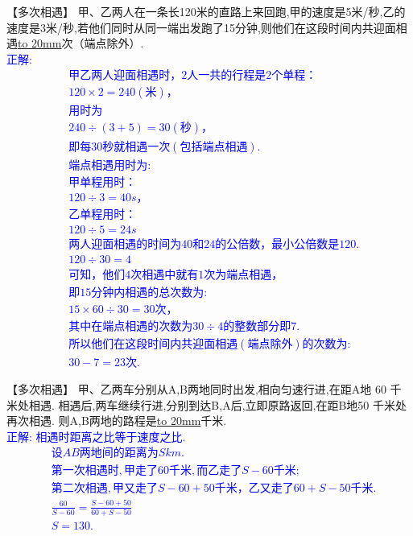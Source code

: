 \item {
    【多次相遇】
    甲、乙两人在一条长120米的直路上来回跑,甲的速度是5米/秒,乙的速度是3米/秒,若他们同时从同一端出发跑了15分钟,则他们在这段时间内共迎面相遇\underline{\hbox to 20mm{}}次（端点除外）. 
    \ifshowSolution 
        \fangsong{}\textcolor{blue}{
            \\正解: 
            \begin{align*}
                &甲乙两人迎面相遇时，2人一共的行程是2个单程： \\
                &120\times 2=240(米)，\\
                &用时为\\
                &240\div (3+5)=30(秒)，\\
                &即每30秒就相遇一次(包括端点相遇).\\
                &端点相遇用时为:\\
                &甲单程用时：\\
                & 120\div 3 = 40 s，\\
                &乙单程用时：\\
                &120\div 5=24 s\\
                &两人迎面相遇的时间为40和24的公倍数，最小公倍数是120.\\
                &120\div 30=4\\
                &可知，他们4次相遇中就有1次为端点相遇，\\
                &即15分钟内相遇的总次数为:\\
                & 15\times 60\div 30 = 30次，\\
                &其中在端点相遇的次数为 30\div 4 的整数部分即7.\\
                &所以他们在这段时间内共迎面相遇(端点除外)的次数为:\\
                &30-7=23 次.
            \end{align*}
        }
    \else
        \vspace{1cm}
    \fi
}

\item {
    【多次相遇】
    甲、乙两车分别从A,B两地同时出发,相向匀速行进,在距A地 60 千米处相遇. 相遇后,两车继续行进,分别到达B,A后,立即原路返回,在距B地50 千米处再次相遇. 则A,B两地的路程是\underline{\hbox to 20mm{}}千米. 
    \ifshowSolution 
        \fangsong{}\textcolor{blue}{
            \\正解: 相遇时距离之比等于速度之比.
            \begin{align*}
                &设AB两地间的距离为S km.\\
                &第一次相遇时,甲走了 60千米,而乙走了S-60 千米; \\
                &第二次相遇,甲又走了S-60+50千米，乙又走了60+S-50千米.\\
                &\frac{60}{S-60} = \frac{S-60+50}{60+S-50}\\
                &S=130.
            \end{align*}
        }
    \else
        \vspace{1cm}
    \fi
}

